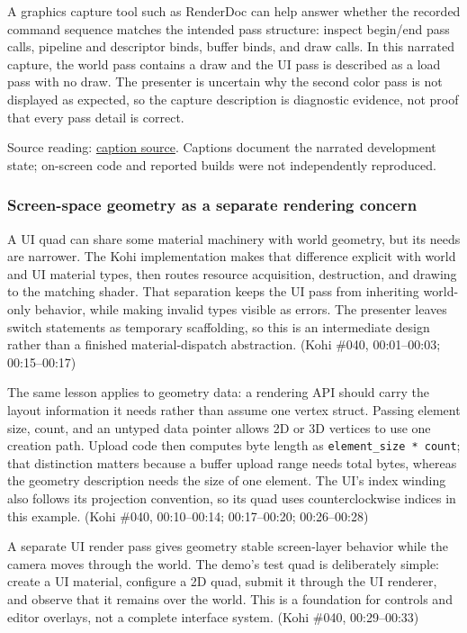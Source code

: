 A graphics capture tool such as RenderDoc can help answer whether the recorded command sequence matches the intended pass structure: inspect begin/end pass calls, pipeline and descriptor binds, buffer binds, and draw calls. In this narrated capture, the world pass contains a draw and the UI pass is described as a load pass with no draw. The presenter is uncertain why the second color pass is not displayed as expected, so the capture description is diagnostic evidence, not proof that every pass detail is correct.

Source reading: \href{https://www.youtube.com/watch?v=sXuf_wHIHgM}{caption source}. Captions document the narrated development state; on-screen code and reported builds were not independently reproduced.

\subsubsection{Screen-space geometry as a separate rendering concern}\label{06-engine-ii-ch026-screen-space-geometry-as-a-separate-rendering-concern}

A UI quad can share some material machinery with world geometry, but its needs are narrower. The Kohi implementation makes that difference explicit with world and UI material types, then routes resource acquisition, destruction, and drawing to the matching shader. That separation keeps the UI pass from inheriting world-only behavior, while making invalid types visible as errors. The presenter leaves switch statements as temporary scaffolding, so this is an intermediate design rather than a finished material-dispatch abstraction. (Kohi \#040, 00:01--00:03; 00:15--00:17)

The same lesson applies to geometry data: a rendering API should carry the layout information it needs rather than assume one vertex struct. Passing element size, count, and an untyped data pointer allows 2D or 3D vertices to use one creation path. Upload code then computes byte length as \texttt{element\_size\ *\ count}; that distinction matters because a buffer upload range needs total bytes, whereas the geometry description needs the size of one element. The UI's index winding also follows its projection convention, so its quad uses counterclockwise indices in this example. (Kohi \#040, 00:10--00:14; 00:17--00:20; 00:26--00:28)

A separate UI render pass gives geometry stable screen-layer behavior while the camera moves through the world. The demo's test quad is deliberately simple: create a UI material, configure a 2D quad, submit it through the UI renderer, and observe that it remains over the world. This is a foundation for controls and editor overlays, not a complete interface system. (Kohi \#040, 00:29--00:33)

